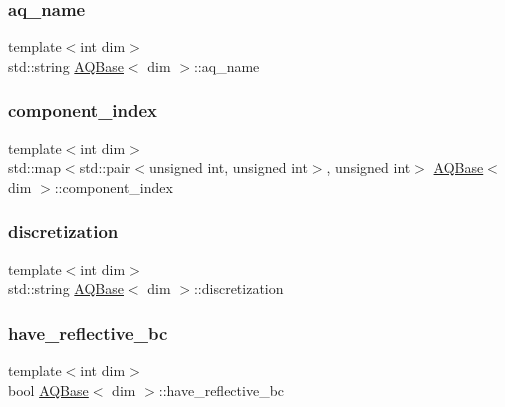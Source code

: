 \subsubsection{\texorpdfstring{aq\+\_\+name}{aq\_name}}
{\footnotesize\ttfamily template$<$int dim$>$ \\
std\+::string \hyperlink{class_a_q_base}{A\+Q\+Base}$<$ dim $>$\+::aq\+\_\+name\hspace{0.3cm}{\ttfamily [private]}}

\mbox{\label{class_a_q_base_a0d9e9c6302e481718d62d76c09c83d2d}} 
\subsubsection{\texorpdfstring{component\+\_\+index}{component\_index}}
{\footnotesize\ttfamily template$<$int dim$>$ \\
std\+::map$<$std\+::pair$<$unsigned int, unsigned int$>$, unsigned int$>$ \hyperlink{class_a_q_base}{A\+Q\+Base}$<$ dim $>$\+::component\+\_\+index\hspace{0.3cm}{\ttfamily [protected]}}

\mbox{\label{class_a_q_base_a6c454af11008e235340a7b8e31a02114}} 
\subsubsection{\texorpdfstring{discretization}{discretization}}
{\footnotesize\ttfamily template$<$int dim$>$ \\
std\+::string \hyperlink{class_a_q_base}{A\+Q\+Base}$<$ dim $>$\+::discretization\hspace{0.3cm}{\ttfamily [protected]}}

\mbox{\label{class_a_q_base_a8afa1e0da5bbb4846e495178e165b5b5}} 
\subsubsection{\texorpdfstring{have\+\_\+reflective\+\_\+bc}{have\_reflective\_bc}}
{\footnotesize\ttfamily template$<$int dim$>$ \\
bool \hyperlink{class_a_q_base}{A\+Q\+Base}$<$ dim $>$\+::have\+\_\+reflective\+\_\+bc\hspace{0.3cm}{\ttfamily [protected]}}

